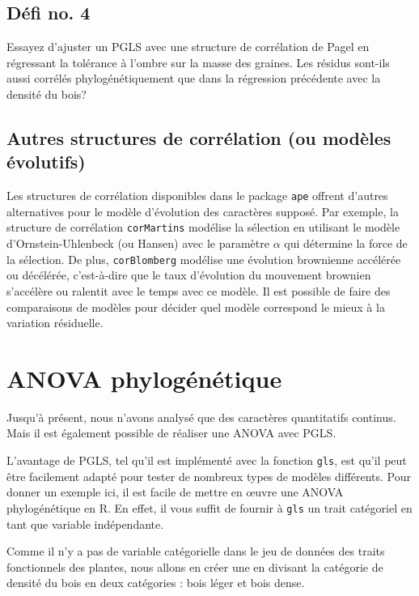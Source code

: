 \documentclass[
]{book}
\begin{document}
\section{Défi no. 4}\label{duxe9fi-no.-4}

Essayez d'ajuster un PGLS avec une structure de corrélation de Pagel en régressant la tolérance à l'ombre sur la masse des graines. Les résidus sont-ils aussi corrélés phylogénétiquement que dans la régression précédente avec la densité du bois?

\section{Autres structures de corrélation (ou modèles évolutifs)}\label{autres-structures-de-corruxe9lation-ou-moduxe8les-uxe9volutifs}

Les structures de corrélation disponibles dans le package \texttt{ape} offrent d'autres alternatives pour le modèle d'évolution des caractères supposé. Par exemple, la structure de corrélation \texttt{corMartins} modélise la sélection en utilisant le modèle d'Ornstein-Uhlenbeck (ou Hansen) avec le paramètre \(\alpha\) qui détermine la force de la sélection. De plus, \texttt{corBlomberg} modélise une évolution brownienne accélérée ou décélérée, c'est-à-dire que le taux d'évolution du mouvement brownien s'accélère ou ralentit avec le temps avec ce modèle. Il est possible de faire des comparaisons de modèles pour décider quel modèle correspond le mieux à la variation résiduelle.

\chapter{ANOVA phylogénétique}\label{anova-phyloguxe9nuxe9tique}

Jusqu'à présent, nous n'avons analysé que des caractères quantitatifs continus. Mais il est également possible de réaliser une ANOVA avec PGLS.

L'avantage de PGLS, tel qu'il est implémenté avec la fonction \texttt{gls}, est qu'il peut être facilement adapté pour tester de nombreux types de modèles différents. Pour donner un exemple ici, il est facile de mettre en œuvre une ANOVA phylogénétique en R. En effet, il vous suffit de fournir à \texttt{gls} un trait catégoriel en tant que variable indépendante.

Comme il n'y a pas de variable catégorielle dans le jeu de données des traits fonctionnels des plantes, nous allons en créer une en divisant la catégorie de densité du bois en deux catégories : bois léger et bois dense.
\end{document}
